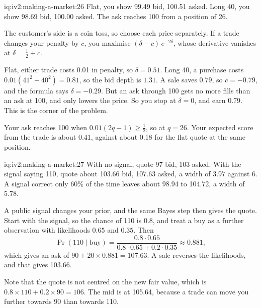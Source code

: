 \begin{solution}{iq:iv2:making-a-market:26}
Flat, you show 99.49 bid, 100.51 asked. Long 40, you show 98.69 bid, 100.00 asked. The ask reaches 100 from a position of 26.

The customer's side is a coin toss, so choose each price separately. If a trade changes your penalty by $c$, you maximise $(\delta - c)\,e^{-2\delta}$, whose derivative vanishes at $\delta = \tfrac12 + c$.

Flat, either trade costs 0.01 in penalty, so $\delta = 0.51$. Long 40, a purchase costs $0.01(41^2 - 40^2) = 0.81$, so the bid depth is $1.31$. A sale saves $0.79$, so $c = -0.79$, and the formula says $\delta = -0.29$. But an ask through 100 gets no more fills than an ask at 100, and only lowers the price. So you stop at $\delta = 0$, and earn 0.79. This is the corner of the problem.

Your ask reaches 100 when $0.01(2q - 1) \ge \tfrac12$, so at $q = 26$. Your expected score from the trade is about 0.41, against about 0.18 for the flat quote at the same position.

\end{solution}

\begin{solution}{iq:iv2:making-a-market:27}
With no signal, quote 97 bid, 103 asked. With the signal saying 110, quote about 103.66 bid, 107.63 asked, a width of 3.97 against 6. A signal correct only 60\% of the time leaves about 98.94 to 104.72, a width of 5.78.

A public signal changes your prior, and the same Bayes step then gives the quote. Start with the signal, so the chance of 110 is 0.8, and treat a buy as a further observation with likelihoods $0.65$ and $0.35$. Then
\[
\Pr(110 \mid \text{buy}) = \frac{0.8 \cdot 0.65}{0.8 \cdot 0.65 + 0.2 \cdot 0.35} \approx 0.881,
\]
which gives an ask of $90 + 20 \times 0.881 = 107.63$. A sale reverses the likelihoods, and that gives 103.66.

Note that the quote is not centred on the new fair value, which is $0.8 \times 110 + 0.2 \times 90 = 106$. The mid is at 105.64, because a trade can move you further towards 90 than towards 110.

\end{solution}

